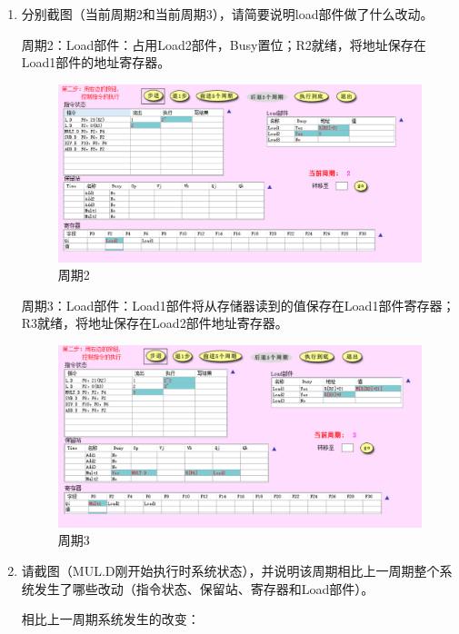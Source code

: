 \documentclass{ctexart}
\begin{document}
\begin{enumerate}
    \item 分别截图（当前周期2和当前周期3），请简要说明load部件做了什么改动。
          \par 周期2：Load部件：占用Load2部件，Busy置位；R2就绪，将地址保存在Load1部件的地址寄存器。
          \par \begin{figure}[htbp]
              \centering
              \includegraphics[scale=0.3]{zq2.png}
              \caption{周期2}
          \end{figure}
          \par 周期3：Load部件：Load1部件将从存储器读到的值保存在Load1部件寄存器；R3就绪，将地址保存在Load2部件地址寄存器。
          \par \begin{figure}[htbp]
              \centering
              \includegraphics[scale=0.3]{zq3.png}
              \caption{周期3}
          \end{figure}
    \item 请截图（MUL.D刚开始执行时系统状态），并说明该周期相比上一周期整个系统发生了哪些改动（指令状态、保留站、寄存器和Load部件）。
          \par 相比上一周期系统发生的改变：
          \begin{itemize}

\end{itemize}
\end{enumerate}
\end{document}
